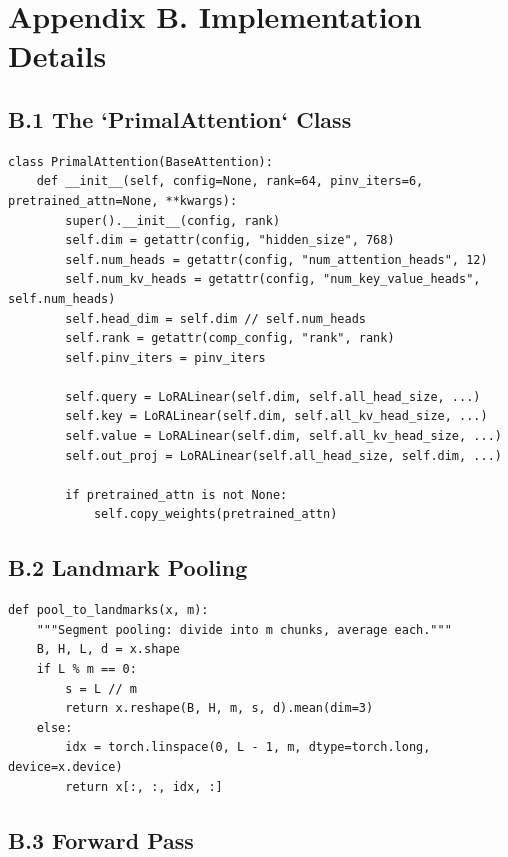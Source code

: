 
\section{Appendix B. Implementation Details}

\subsection{B.1 The `PrimalAttention` Class}

\begin{lstlisting}
class PrimalAttention(BaseAttention):
    def __init__(self, config=None, rank=64, pinv_iters=6, pretrained_attn=None, **kwargs):
        super().__init__(config, rank)
        self.dim = getattr(config, "hidden_size", 768)
        self.num_heads = getattr(config, "num_attention_heads", 12)
        self.num_kv_heads = getattr(config, "num_key_value_heads", self.num_heads)
        self.head_dim = self.dim // self.num_heads
        self.rank = getattr(comp_config, "rank", rank)
        self.pinv_iters = pinv_iters
        
        self.query = LoRALinear(self.dim, self.all_head_size, ...)
        self.key = LoRALinear(self.dim, self.all_kv_head_size, ...)
        self.value = LoRALinear(self.dim, self.all_kv_head_size, ...)
        self.out_proj = LoRALinear(self.all_head_size, self.dim, ...)
        
        if pretrained_attn is not None:
            self.copy_weights(pretrained_attn)
\end{lstlisting}

\subsection{B.2 Landmark Pooling}

\begin{lstlisting}
def pool_to_landmarks(x, m):
    """Segment pooling: divide into m chunks, average each."""
    B, H, L, d = x.shape
    if L % m == 0:
        s = L // m
        return x.reshape(B, H, m, s, d).mean(dim=3)
    else:
        idx = torch.linspace(0, L - 1, m, dtype=torch.long, device=x.device)
        return x[:, :, idx, :]
\end{lstlisting}

\subsection{B.3 Forward Pass}

